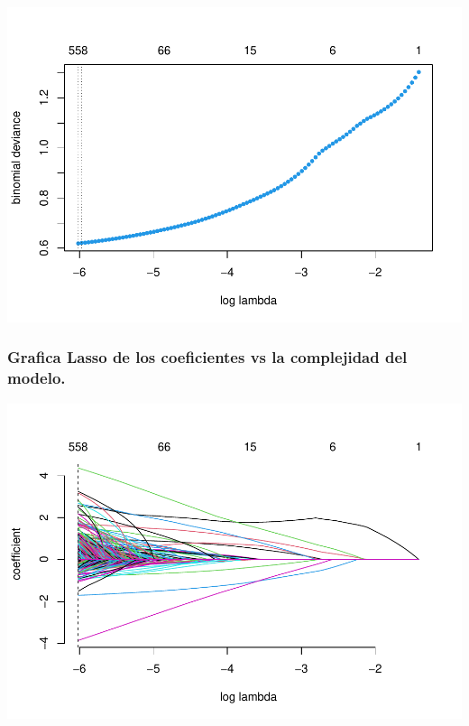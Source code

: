 \documentclass[
]{article}
\newenvironment{Shaded}{\begin{snugshade}}{\end{snugshade}}
\newcommand{\FunctionTok}[1]{\textcolor[rgb]{0.00,0.00,0.00}{#1}}
\newcommand{\NormalTok}[1]{#1}
\newcommand{\SpecialCharTok}[1]{\textcolor[rgb]{0.00,0.00,0.00}{#1}}
\begin{document}
\includegraphics{report_files/figure-latex/unnamed-chunk-22-1.pdf}

\hypertarget{grafica-lasso-de-los-coeficientes-vs-la-complejidad-del-modelo.}{%
\subsubsection{Grafica Lasso de los coeficientes vs la complejidad del
modelo.}\label{grafica-lasso-de-los-coeficientes-vs-la-complejidad-del-modelo.}}

\begin{Shaded}
\end{Shaded}

\includegraphics{report_files/figure-latex/unnamed-chunk-23-1.pdf}
\end{document}
